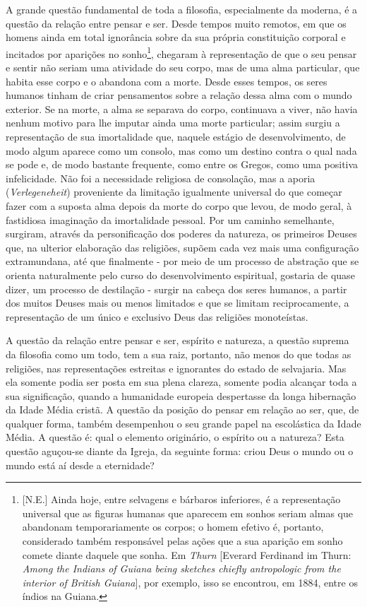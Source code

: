 A grande questão fundamental de toda a filosofia, especialmente da
moderna, é a questão da relação entre pensar e ser. Desde tempos muito
remotos, em que os homens ainda em total ignorância sobre da sua própria
constituição corporal e incitados por aparições no sonho\footnote{{[}N.E.{]}
  Ainda hoje, entre selvagens e bárbaros inferiores, é a representação
  universal que as figuras humanas que aparecem em sonhos seriam almas
  que abandonam temporariamente os corpos; o homem efetivo é, portanto,
  considerado também responsável pelas ações que a sua aparição em sonho
  comete diante daquele que sonha. Em \emph{Thurn} {[}Everard Ferdinand
  im Thurn: \emph{Among the Indians of Guiana being sketches chiefly
  antropologic from the interior of British Guiana}{]}, por exemplo,
  isso se encontrou, em 1884, entre os índios na Guiana.}\protect\hypertarget{r12}{}{},
chegaram à representação de que o seu pensar e sentir não seriam uma
atividade do seu corpo, mas de uma alma particular, que habita esse
corpo e o abandona com a morte. Desde esses tempos, os seres humanos
tinham de criar pensamentos sobre a relação dessa alma com o mundo
exterior. Se na morte, a alma se separava do corpo, continuava a viver,
não havia nenhum motivo para lhe imputar ainda uma morte particular;
assim surgiu a representação de sua imortalidade que, naquele estágio de
desenvolvimento, de modo algum aparece como um consolo, mas como um
destino contra o qual nada se pode e, de modo bastante frequente, como
entre os Gregos, como uma positiva infelicidade. Não foi a necessidade
religiosa de consolação, mas a aporia (\emph{Verlegeneheit}) proveniente
da limitação igualmente universal do que começar fazer com a suposta
alma depois da morte do corpo que levou, de modo geral, à fastidiosa
imaginação da imortalidade pessoal. Por um caminho semelhante, surgiram,
através da personificação dos poderes da natureza, os primeiros Deuses
que, na ulterior elaboração das religiões, supõem cada vez mais uma
configuração extramundana, até que finalmente - por meio de um processo
de abstração que se orienta naturalmente pelo curso do desenvolvimento
espiritual, gostaria de quase dizer, um processo de destilação - surgir
na cabeça dos seres humanos, a partir dos muitos Deuses mais ou menos
limitados e que se limitam reciprocamente, a representação de um único e
exclusivo Deus das religiões monoteístas.

A questão da relação entre pensar e ser, espírito e natureza, a questão
suprema da filosofia como um todo, tem a sua raiz, portanto, não menos
do que todas as religiões, nas representações estreitas e ignorantes do
estado de selvajaria. Mas ela somente podia ser posta em sua plena
clareza, somente podia alcançar toda a sua significação, quando a
humanidade europeia despertasse da longa hibernação da Idade Média
cristã. A questão da posição do pensar em relação ao ser, que, de
qualquer forma, também desempenhou o seu grande papel na escolástica da
Idade Média. A questão é: qual o elemento originário, o espírito ou a
natureza? Esta questão aguçou-se diante da Igreja, da seguinte forma:
criou Deus o mundo ou o mundo está aí desde a eternidade?

